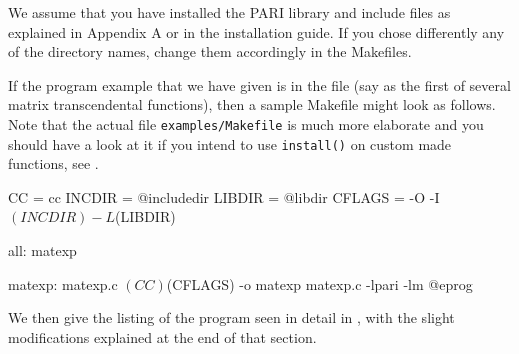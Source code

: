 %
%

We assume that you have installed the PARI library and include files as
explained in Appendix A or in the installation guide. If you chose
differently any of the directory names, change them accordingly in the
Makefiles.

If the program example that we have given is in the file  (say
as the first of several matrix transcendental functions), then a sample
Makefile might look as follows. Note that the actual file
{\tt examples/Makefile} is much more elaborate and you should have a look at
it if you intend to use {\tt install()} on custom made functions, see
.

\bprog
CC = cc
INCDIR = @includedir
LIBDIR = @libdir
CFLAGS = -O -I$(INCDIR) -L$(LIBDIR)

all:  matexp

matexp:  matexp.c
      $(CC) $(CFLAGS) -o matexp matexp.c -lpari -lm
@eprog

\noindent We then give the listing of the program 
seen in detail in , with the slight modifications explained
at the end of that section.

\vfill\eject
